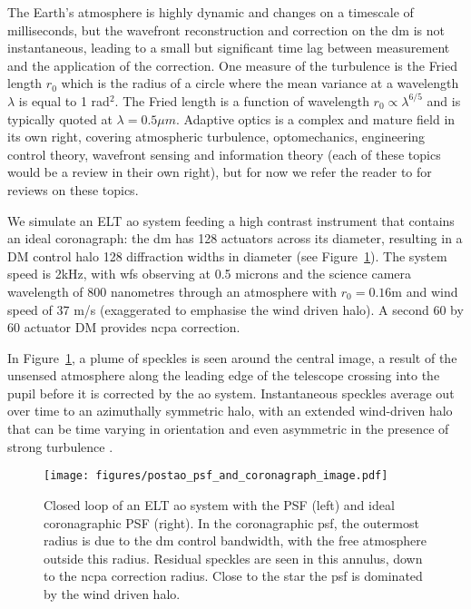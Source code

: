 \documentclass[letterpaper]{ar-1col}
\begin{document}
The Earth's atmosphere is highly dynamic and changes on a timescale of milliseconds, but the wavefront reconstruction and correction on the \ac{dm} is not instantaneous, leading to a small but significant time lag between measurement and the application of the correction.
%
One measure of the turbulence is the Fried length $r_0$ which is the radius of a circle where the mean variance at a wavelength $\lambda$ is equal to 1 rad$^2$.
%
The Fried length is a function of wavelength $r_0 \propto \lambda^{6/5}$ and is typically quoted at $\lambda = 0.5 \mu m$.
%
Adaptive optics is a complex and mature field in its own right, covering atmospheric turbulence, optomechanics, engineering control theory, wavefront sensing and information theory (each of these topics would be a review in their own right), but for now we refer the reader to \citet{Guyon18} for reviews on these topics. 

We simulate an ELT \ac{ao} system feeding a high contrast instrument that contains an ideal coronagraph: the \ac{dm} has 128 actuators across its diameter, resulting in a DM control halo 128 diffraction widths in diameter (see Figure~\ref{fig:aopsf}). 
%
The system speed is 2kHz, with \ac{wfs} observing at 0.5 microns and the science camera wavelength of 800 nanometres through an atmosphere with $r_0=0.16$m and wind speed of 37 m/s (exaggerated to emphasise the wind driven halo).
%
A second 60 by 60 actuator DM provides \ac{ncpa} correction.

In Figure~\ref{fig:aopsf}, a plume of speckles is seen around the central image, a result of the unsensed atmosphere along the leading edge of the telescope crossing into the pupil before it is corrected by the \ac{ao} system. 
%
Instantaneous speckles average out over time to an azimuthally symmetric halo, with an extended wind-driven halo that can be time varying in orientation and even asymmetric in the presence of strong turbulence \citep{Cantalloube18}.


\begin{figure}[ht]
  \centering
  \texttt{[image: figures/postao\_psf\_and\_coronagraph\_image.pdf]}
  \caption{Closed loop of an ELT \ac{ao} system with the PSF (left) and ideal coronagraphic PSF (right).
  In the coronagraphic \ac{psf}, the outermost radius is due to the \ac{dm} control bandwidth, with the free atmosphere outside this radius.
  Residual speckles are seen in this annulus, down to the \ac{ncpa} correction radius.
  Close to the star the \ac{psf} is dominated by the wind driven halo.
  }
  \label{fig:aopsf}
\end{figure}
\end{document}
